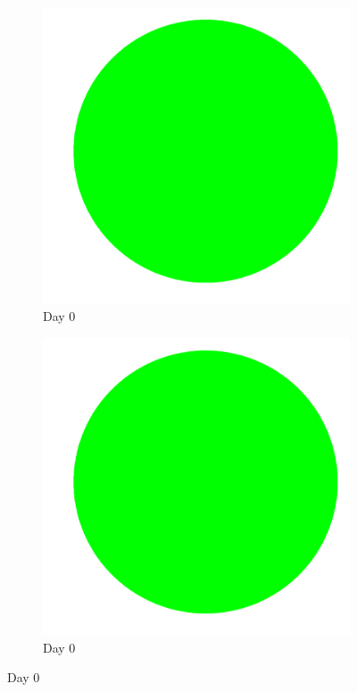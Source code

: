 \documentclass[a4paper]{article}
\begin{document}
\clearpage
\begin{center}
\begin{minipage}{0.65\linewidth}
\begin{figure}[H]
    \centering
    \begin{subfigure}[b]{0.4\linewidth}
        \includegraphics[width=\linewidth]{cell_to_cell_photos/celltocell0.png}
        \caption{Day 0}
    \end{subfigure}
    \begin{subfigure}[b]{0.4\linewidth}
        \includegraphics[width=\linewidth]{cell_free_photos/cellfree0.png}
        \caption{Day 0}
    \end{subfigure}


\end{figure}
\end{minipage}
\end{center}
\end{document}
